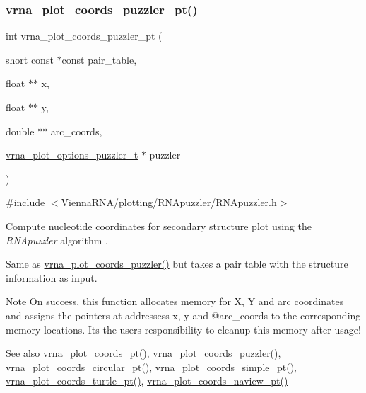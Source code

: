 \subsubsection{\texorpdfstring{vrna\_plot\_coords\_puzzler\_pt()}{vrna\_plot\_coords\_puzzler\_pt()}}
{\footnotesize\ttfamily int vrna\+\_\+plot\+\_\+coords\+\_\+puzzler\+\_\+pt (\begin{DoxyParamCaption}\item[{short const $\ast$const}]{pair\+\_\+table,  }\item[{float $\ast$$\ast$}]{x,  }\item[{float $\ast$$\ast$}]{y,  }\item[{double $\ast$$\ast$}]{arc\+\_\+coords,  }\item[{\mbox{\hyperlink{group__plot__layout__utils_structvrna__plot__options__puzzler__t}{vrna\+\_\+plot\+\_\+options\+\_\+puzzler\+\_\+t}} $\ast$}]{puzzler }\end{DoxyParamCaption})}



{\ttfamily \#include $<$\mbox{\hyperlink{RNApuzzler_8h}{Vienna\+R\+N\+A/plotting/\+R\+N\+Apuzzler/\+R\+N\+Apuzzler.\+h}}$>$}



Compute nucleotide coordinates for secondary structure plot using the {\itshape R\+N\+Apuzzler} algorithm \cite{wiegreffe:2018}. 

Same as \mbox{\hyperlink{group__plot__layout__utils_gafd49896df8780c9669125429bc0da9b3}{vrna\+\_\+plot\+\_\+coords\+\_\+puzzler()}} but takes a pair table with the structure information as input.

\begin{DoxyNote}{Note}
On success, this function allocates memory for X, Y and arc coordinates and assigns the pointers at addressess {\ttfamily x}, {\ttfamily y} and @arc\+\_\+coords to the corresponding memory locations. It\textquotesingle{}s the users responsibility to cleanup this memory after usage!
\end{DoxyNote}
\begin{DoxySeeAlso}{See also}
\mbox{\hyperlink{group__plot__layout__utils_gaccd6a87cb324b7d680e5dd93e112738b}{vrna\+\_\+plot\+\_\+coords\+\_\+pt()}}, \mbox{\hyperlink{group__plot__layout__utils_gafd49896df8780c9669125429bc0da9b3}{vrna\+\_\+plot\+\_\+coords\+\_\+puzzler()}}, \mbox{\hyperlink{group__plot__layout__utils_gaeec80faa235f3ca489bc5e50adc41460}{vrna\+\_\+plot\+\_\+coords\+\_\+circular\+\_\+pt()}}, \mbox{\hyperlink{group__plot__layout__utils_ga76788091848e73cfb24b31536e22b7dd}{vrna\+\_\+plot\+\_\+coords\+\_\+simple\+\_\+pt()}}, \mbox{\hyperlink{group__plot__layout__utils_ga3d3531ebbca9054240c73bff115c4dcf}{vrna\+\_\+plot\+\_\+coords\+\_\+turtle\+\_\+pt()}}, \mbox{\hyperlink{group__plot__layout__utils_gaa5089debe89c11e301dea04b3236efe3}{vrna\+\_\+plot\+\_\+coords\+\_\+naview\+\_\+pt()}}
\end{DoxySeeAlso}

